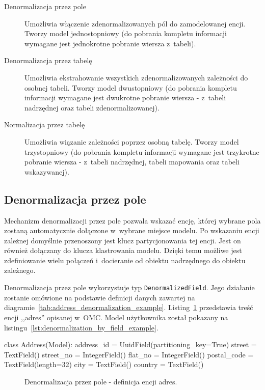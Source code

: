 \begin{description}
	\item[Denormalizacja przez pole] Umożliwia włączenie zdenormalizowanych pól do zamodelowanej encji. Tworzy model jednostopniowy (do pobrania kompletu informacji wymagane jest jednokrotne pobranie wiersza z~tabeli).
	\item[Denormalizacja przez tabelę] Umożliwia ekstrahowanie wszystkich zdenormalizowanych zależności do osobnej tabeli. Tworzy model dwustopniowy (do pobrania kompletu informacji wymagane jest dwukrotne pobranie wiersza - z~tabeli nadrzędnej oraz tabeli zdenormalizowanej).
	\item[Normalizacja przez tabelę] Umożliwia wiązanie zależności poprzez osobną tabelę. Tworzy model trzystopniowy (do pobrania kompletu informacji wymagane jest trzykrotne pobranie wiersza - z~tabeli nadrzędnej, tabeli mapowania oraz tabeli wskazywanej).
\end{description}

\subsection{Denormalizacja przez pole}

Mechanizm denormalizacji przez pole pozwala wskazać encję, której wybrane pola zostaną automatycznie dołączone w~wybrane miejsce modelu. Po wskazaniu encji zależnej domyślnie przenoszony jest klucz partycjonowania tej encji. Jest on również dołączany do klucza klastrowania modelu. Dzięki temu możliwe jest zdefiniowanie wielu połączeń i~docieranie od obiektu nadrzędnego do obiektu zależnego. 

Denormalizacja przez pole wykorzystuje typ \verb+DenormalizedField+. Jego działanie zostanie omówione na podstawie definicji danych zawartej na diagramie~\ref{tab:address_denormalization_example}. Listing~\ref{lst:denormalization_by_field_address_entity} przedstawia treść encji ,,adres'' opisanej w~OMC. Model użytkownika został pokazany na listingu~\ref{lst:denormalization_by_field_example}. 

\begin{verbbox}[\footnotesize]
class Address(Model):
    address_id = UuidField(partitioning_key=True)
    street = TextField()
    street_no = IntegerField()
    flat_no = IntegerField()
    postal_code = TextField(length=32)
    city = TextField()
    country = TextField()
\end{verbbox}

\begin{figure}[ht!]
	\centering
	\theverbbox
	\caption{Denormalizacja przez pole - definicja encji adres.}
	\label{lst:denormalization_by_field_address_entity}
\end{figure}

